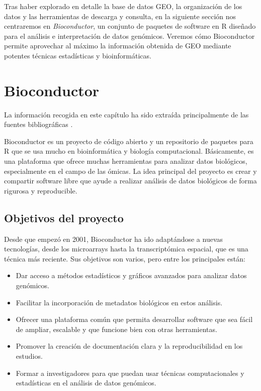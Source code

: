 Tras haber explorado en detalle la base de datos GEO, la organización de los datos y las herramientas de descarga y consulta, en la siguiente sección nos centraremos en \textit{Bioconductor}, un conjunto de paquetes de software en R 
diseñado para el análisis e interpretación de datos genómicos. Veremos cómo Bioconductor permite aprovechar al máximo la información obtenida de GEO mediante potentes técnicas estadísticas y bioinformáticas.

\newpage

\chapter{Bioconductor}  %

La información recogida en este capítulo ha sido extraída principalmente de las fuentes bibliográficas \cite{bioconductor-1,bioconductor-about,bioconductor-about2,bioconductor-2}. \newline

Bioconductor es un proyecto de código abierto y un repositorio de paquetes para R que se usa mucho en bioinformática y biología computacional. 
Básicamente, es una plataforma que ofrece muchas herramientas para analizar datos biológicos, especialmente en el campo de las ómicas. 
La idea principal del proyecto es crear y compartir software libre que ayude a realizar análisis de datos biológicos de forma rigurosa y reproducible.

\section{Objetivos del proyecto}

Desde que empezó en 2001, Bioconductor ha ido adaptándose a nuevas tecnologías, desde los microarrays hasta la transcriptómica espacial, que 
es una técnica más reciente. Sus objetivos son varios, pero entre los principales están:

\begin{itemize}
\item Dar acceso a métodos estadísticos y gráficos avanzados para analizar datos genómicos.
\item Facilitar la incorporación de metadatos biológicos en estos análisis.
\item Ofrecer una plataforma común que permita desarrollar software que sea fácil de ampliar, escalable y que funcione bien con otras herramientas.
\item Promover la creación de documentación clara y la reproducibilidad en los estudios.
\item Formar a investigadores para que puedan usar técnicas computacionales y estadísticas en el análisis de datos genómicos.
\end{itemize}

